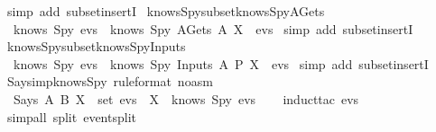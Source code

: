 \begin{isabellebody}
  \isatagproof
  \isamarkupfalse%
  \ {\isacharparenleft}simp\ add{\isacharcolon}\ subset{\isacharunderscore}insertI{\isacharparenright}%
  \endisatagproof
  {\isafoldproof}%
  \isadelimproof
  \isanewline
  \endisadelimproof
  \isanewline
  \isamarkupfalse%
  \ knows{\isacharunderscore}Spy{\isacharunderscore}subset{\isacharunderscore}knows{\isacharunderscore}Spy{\isacharunderscore}AGets\ {\isacharcolon}\isanewline
  \ \ {\isachardoublequoteopen}knows\ Spy\ evs\ {\isasymsubseteq}\ knows\ Spy\ {\isacharparenleft}AGets\ A\ X\ {\isacharhash}\ evs{\isacharparenright}{\isachardoublequoteclose}\isanewline
  \isadelimproof
  \endisadelimproof
  \isatagproof
  \isamarkupfalse%
  \ {\isacharparenleft}simp\ add{\isacharcolon}\ subset{\isacharunderscore}insertI{\isacharparenright}%
  \endisatagproof
  {\isafoldproof}%
  \isadelimproof
  \isanewline
  \endisadelimproof
  \isanewline
  \isamarkupfalse%
  \ knows{\isacharunderscore}Spy{\isacharunderscore}subset{\isacharunderscore}knows{\isacharunderscore}Spy{\isacharunderscore}Inputs\ {\isacharcolon}\isanewline
  \ \ {\isachardoublequoteopen}knows\ Spy\ evs\ {\isasymsubseteq}\ knows\ Spy\ {\isacharparenleft}Inputs\ A\ P\ X\ {\isacharhash}\ evs{\isacharparenright}{\isachardoublequoteclose}\isanewline
  \isadelimproof
  \endisadelimproof
  \isatagproof
  \isamarkupfalse%
  \ {\isacharparenleft}simp\ add{\isacharcolon}\ subset{\isacharunderscore}insertI{\isacharparenright}%
  \endisatagproof
  {\isafoldproof}%
  \isadelimproof
  \isanewline
  \endisadelimproof
  \isanewline
  \isanewline
  \isamarkupfalse%
  \ Says{\isacharunderscore}imp{\isacharunderscore}knows{\isacharunderscore}Spy\ {\isacharbrackleft}rule{\isacharunderscore}format\ {\isacharparenleft}no{\isacharunderscore}asm{\isacharparenright}{\isacharbrackright}\ {\isacharcolon}\isanewline
  \ \ {\isachardoublequoteopen}Says\ A\ B\ X\ {\isasymin}\ set\ evs\ {\isasymlongrightarrow}\ X\ {\isasymin}\ knows\ Spy\ evs{\isachardoublequoteclose}\isanewline
  \isadelimproof
  \isanewline
  \ \ %
  \endisadelimproof
  \isatagproof
  \isamarkupfalse%
  \ {\isacharparenleft}induct{\isacharunderscore}tac\ {\isachardoublequoteopen}evs{\isachardoublequoteclose}{\isacharparenright}\isanewline
  \ \ \isamarkupfalse%
  \ {\isacharparenleft}simp{\isacharunderscore}all\ split{\isacharcolon}\ event{\isachardot}split{\isacharparenright}\isanewline
  \isamarkupfalse%
  \endisatagproof

\end{isabellebody}
